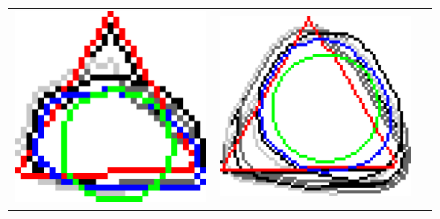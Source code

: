 \begin{figure}
\begin{tabular}{ccc}
\includegraphics[scale=0.25]{figures/chapter5/flow/triangle/radius_3/mdca/elastica/len_pen_0.01000/jonctions_1/curve_segs_4/best/gs_1.00000/summary.pdf} &
\includegraphics[scale=0.25]{figures/chapter5/flow/triangle/radius_3/mdca/elastica/len_pen_0.01000/jonctions_1/curve_segs_4/best/gs_0.50000/summary.pdf} &

\end{tabular}
\end{figure}
